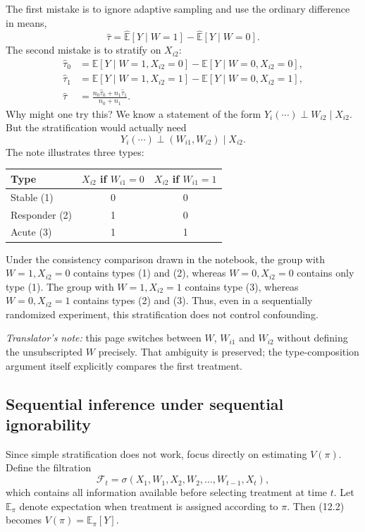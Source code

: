The first mistake is to ignore adaptive sampling and use the ordinary difference in means,
\[
 \widehat\tau=\widehat{\mathbb E}[Y\mid W=1]
 -\widehat{\mathbb E}[Y\mid W=0].
\]
The second mistake is to stratify on $X_{i2}$:
\begin{align*}
 \widehat\tau_0&=\mathbb E[Y\mid W=1,X_{i2}=0]
 -\mathbb E[Y\mid W=0,X_{i2}=0],\\
 \widehat\tau_1&=\mathbb E[Y\mid W=1,X_{i2}=1]
 -\mathbb E[Y\mid W=0,X_{i2}=1],\\
 \widehat\tau&=\frac{n_0\widehat\tau_0+n_1\widehat\tau_1}{n_0+n_1}.
\end{align*}
Why might one try this? We know a statement of the form $Y_i(\cdots)\perp W_{i2}\mid X_{i2}$. But the stratification would actually need
\[
 Y_i(\cdots)\perp(W_{i1},W_{i2})\mid X_{i2}.
\]
The note illustrates three types:
\begin{center}
\begin{tabular}{lcc}
 Type & $X_{i2}$ if $W_{i1}=0$ & $X_{i2}$ if $W_{i1}=1$\\\hline
 Stable (1) & 0 & 0\\
 Responder (2) & 1 & 0\\
 Acute (3) & 1 & 1
\end{tabular}
\end{center}
Under the consistency comparison drawn in the notebook, the group with $W=1,X_{i2}=0$ contains types (1) and (2), whereas $W=0,X_{i2}=0$ contains only type (1). The group with $W=1,X_{i2}=1$ contains type (3), whereas $W=0,X_{i2}=1$ contains types (2) and (3). Thus, even in a sequentially randomized experiment, this stratification does not control confounding.

\textit{Translator's note:} this page switches between $W$, $W_{i1}$ and $W_{i2}$ without defining the unsubscripted $W$ precisely. That ambiguity is preserved; the type-composition argument itself explicitly compares the first treatment.

\subsection{Sequential inference under sequential ignorability}
Since simple stratification does not work, focus directly on estimating $V(\pi)$. Define the filtration
\[
 \mathcal F_t=\sigma(X_1,W_1,X_2,W_2,\ldots,W_{t-1},X_t),
\]
which contains all information available before selecting treatment at time $t$. Let $\mathbb E_\pi$ denote expectation when treatment is assigned according to $\pi$. Then (12.2) becomes $V(\pi)=\mathbb E_\pi[Y]$.

